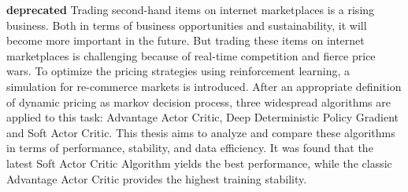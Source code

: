 \textbf{deprecated}
Trading second-hand items on internet marketplaces is a rising business.
Both in terms of business opportunities and sustainability, it will become more important in the future.
But trading these items on internet marketplaces is challenging because of real-time competition and fierce price wars.
To optimize the pricing strategies using reinforcement learning, a simulation for re-commerce markets is introduced.
After an appropriate definition of dynamic pricing as markov decision process, three widespread algorithms are applied to this task:
Advantage Actor Critic, Deep Deterministic Policy Gradient and Soft Actor Critic.
This thesis aims to analyze and compare these algorithms in terms of performance, stability, and data efficiency.
It was found that the latest Soft Actor Critic Algorithm yields the best performance, while the classic Advantage Actor Critic provides the highest training stability.
